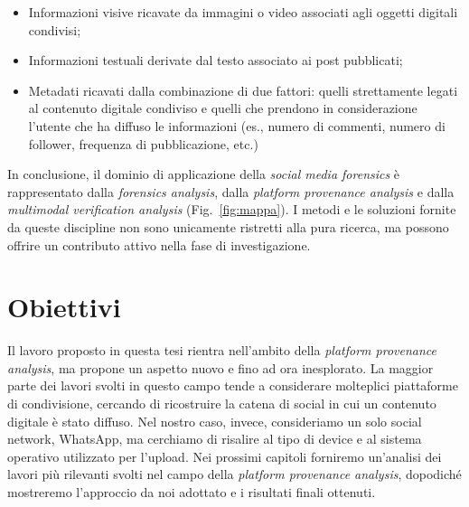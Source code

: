 \begin{itemize}
    \item Informazioni visive ricavate da immagini o video associati agli oggetti digitali condivisi;
    \item Informazioni testuali derivate dal testo associato ai post pubblicati;
    \item Metadati ricavati dalla combinazione di due fattori: quelli strettamente legati al contenuto digitale condiviso e quelli che prendono in considerazione l'utente che ha diffuso le informazioni (es., numero di commenti, numero di follower, frequenza di pubblicazione, etc.)
\end{itemize}
In conclusione, il dominio di applicazione della \textit{social media forensics} è rappresentato dalla \textit{forensics analysis}, dalla \textit{platform provenance analysis} e dalla \textit{multimodal verification analysis} (Fig.~\ref{fig:mappa}). I metodi e le soluzioni fornite da queste discipline non sono unicamente ristretti alla pura ricerca, ma possono offrire un contributo attivo nella fase di investigazione.

\section{Obiettivi}
\label{sec:obiettivi}

Il lavoro proposto in questa tesi rientra nell'ambito della \textit{platform provenance analysis}, ma propone un aspetto nuovo e fino ad ora inesplorato. La maggior parte dei lavori svolti in questo campo tende a considerare molteplici piattaforme di condivisione, cercando di ricostruire la catena di social in cui un contenuto digitale è stato diffuso. Nel nostro caso, invece, consideriamo un solo social network, WhatsApp, ma cerchiamo di risalire al tipo di device e al sistema operativo utilizzato per l'upload. Nei prossimi capitoli forniremo un'analisi dei lavori più rilevanti svolti nel campo della \textit{platform provenance analysis}, dopodiché mostreremo l'approccio da noi adottato e i risultati finali ottenuti.

